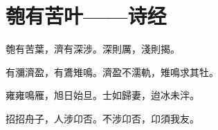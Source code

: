 \section{匏有苦叶——诗经}

匏有苦葉，濟有深涉。深則厲，淺則揭。

有瀰濟盈，有鷕雉鳴。濟盈不濡軌，雉鳴求其牡。

雍雍鳴雁，旭日始旦。士如歸妻，迨冰未泮。

招招舟子，人涉卬否。不涉卬否，卬須我友。